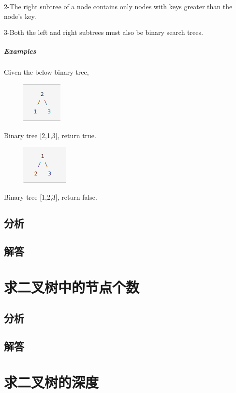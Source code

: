 \documentclass[UTF8,a4paper,12pt]{ctexbook}
\begin{document}
		2-The right subtree of a node contains only nodes with keys greater than the node's key.
		
		3-Both the left and right subtrees must also be binary search trees.
	\subparagraph{Examples}
		Given the below binary tree,
		
		\begin{figure}[h]
			\centering
			\includegraphics[scale = 1]{Tree_2.png}
		\end{figure}
		
		Binary tree [2,1,3], return true.
		
		\begin{figure}[h]
			\centering
			\includegraphics[scale = 1]{Tree_3.png}
		\end{figure}
		
		Binary tree [1,2,3], return false.
	\subsection{分析}
	
	\subsection{解答}
	
\section{求二叉树中的节点个数}
	\subsection{分析}
	
	\subsection{解答}
	
\section{求二叉树的深度}
\end{document}
